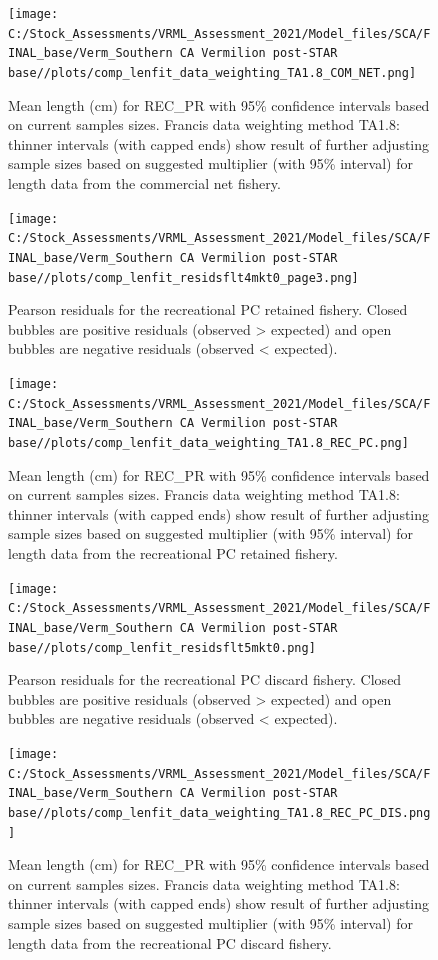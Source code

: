\documentclass[11pt,
  english,
]{article}
\begin{document}
\begin{figure}
\centering
\texttt{[image: C:/Stock\_Assessments/VRML\_Assessment\_2021/Model\_files/SCA/FINAL\_base/Verm\_Southern CA Vermilion post-STAR base//plots/comp\_lenfit\_data\_weighting\_TA1.8\_COM\_NET.png]}
\caption{Mean length (cm) for REC\_PR with 95\% confidence intervals based on current samples sizes. Francis data weighting method TA1.8: thinner intervals (with capped ends) show result of further adjusting sample sizes based on suggested multiplier (with 95\% interval) for length data from the commercial net fishery.\label{fig:mean-len-fit-COM-NET}}
\end{figure}

\begin{figure}
\centering
\texttt{[image: C:/Stock\_Assessments/VRML\_Assessment\_2021/Model\_files/SCA/FINAL\_base/Verm\_Southern CA Vermilion post-STAR base//plots/comp\_lenfit\_residsflt4mkt0\_page3.png]}
\caption{Pearson residuals for the recreational PC retained fishery. Closed bubbles are positive residuals (observed \textgreater{} expected) and open bubbles are negative residuals (observed \textless{} expected).\label{fig:len-pearson-REC-PC}}
\end{figure}

\begin{figure}
\centering
\texttt{[image: C:/Stock\_Assessments/VRML\_Assessment\_2021/Model\_files/SCA/FINAL\_base/Verm\_Southern CA Vermilion post-STAR base//plots/comp\_lenfit\_data\_weighting\_TA1.8\_REC\_PC.png]}
\caption{Mean length (cm) for REC\_PR with 95\% confidence intervals based on current samples sizes. Francis data weighting method TA1.8: thinner intervals (with capped ends) show result of further adjusting sample sizes based on suggested multiplier (with 95\% interval) for length data from the recreational PC retained fishery.\label{fig:mean-len-fit-REC-PC}}
\end{figure}

\begin{figure}
\centering
\texttt{[image: C:/Stock\_Assessments/VRML\_Assessment\_2021/Model\_files/SCA/FINAL\_base/Verm\_Southern CA Vermilion post-STAR base//plots/comp\_lenfit\_residsflt5mkt0.png]}
\caption{Pearson residuals for the recreational PC discard fishery. Closed bubbles are positive residuals (observed \textgreater{} expected) and open bubbles are negative residuals (observed \textless{} expected).\label{fig:len-pearson-REC-PC-DIS}}
\end{figure}

\begin{figure}
\centering
\texttt{[image: C:/Stock\_Assessments/VRML\_Assessment\_2021/Model\_files/SCA/FINAL\_base/Verm\_Southern CA Vermilion post-STAR base//plots/comp\_lenfit\_data\_weighting\_TA1.8\_REC\_PC\_DIS.png]}
\caption{Mean length (cm) for REC\_PR with 95\% confidence intervals based on current samples sizes. Francis data weighting method TA1.8: thinner intervals (with capped ends) show result of further adjusting sample sizes based on suggested multiplier (with 95\% interval) for length data from the recreational PC discard fishery.\label{fig:mean-len-fit-REC-PC-DIS}}
\end{figure}
\end{document}
